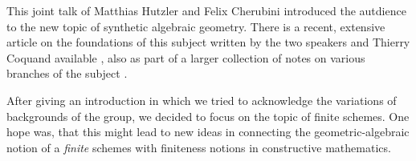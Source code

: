 This joint talk of Matthias Hutzler and Felix Cherubini introduced the autdience to the new topic of synthetic algebraic geometry. There is a recent, extensive article on the foundations of this subject written by the two speakers and Thierry Coquand available \cite{draft}, also as part of a larger collection of notes on various branches of the subject \cite{sag-project}.

After giving an introduction in which we tried to acknowledge the variations of backgrounds of the group, we decided to focus on the topic of finite schemes. One hope was, that this might lead to new ideas in connecting the geometric-algebraic notion of a \emph{finite} schemes with finiteness notions in constructive mathematics.


